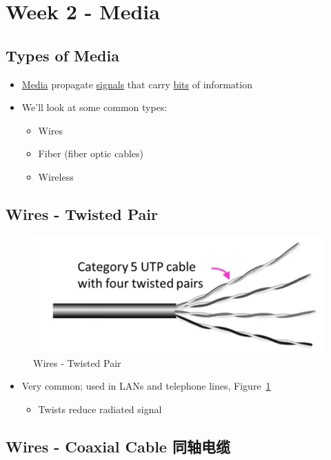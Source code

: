 \documentclass[12pt]{ctexart}   %
\begin{document}
\section{Week 2 - Media}
	\subsection{Types of Media}
	\begin{itemize}
		\item \underline{Media} propagate \underline{signals} that carry \underline{bits} of information
		\item We'll look at some common types:
		\begin{itemize}
			\item Wires
			\item Fiber (fiber optic cables)
			\item Wireless
		\end{itemize}
	\end{itemize}
	
	\subsection{Wires - Twisted Pair}
	
	\begin{figure}[h!] %
	 \centering
	 \includegraphics[scale=0.7]{images/2-2-1}
	\caption{ Wires - Twisted Pair}
	 \label{fig:2-2-1}
	 \end{figure}
	 
	\begin{itemize}
		\item Very common; used in LANs and telephone lines, Figure~\ref{fig:2-2-1}
		\begin{itemize}
			\item Twists reduce radiated signal
		\end{itemize}
	\end{itemize}
	
	\subsection{Wires - Coaxial Cable 同轴电缆}
	
\end{document}
